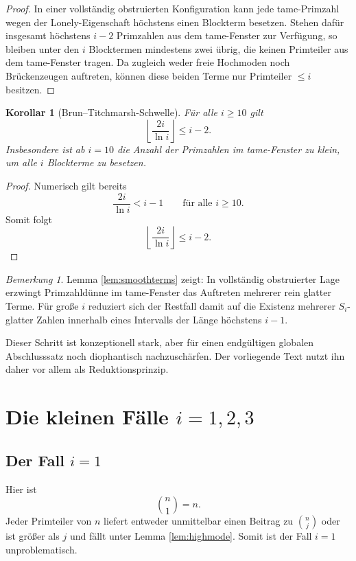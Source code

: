 \documentclass[12pt,a4paper]{article}
\theoremstyle{plain}
\newtheorem{korollar}{Korollar}
\theoremstyle{definition}
\theoremstyle{remark}
\newtheorem{bemerkung}{Bemerkung}
\begin{document}
	\begin{proof}
		In einer vollständig obstruierten Konfiguration kann jede tame-Primzahl wegen der Lonely-Eigenschaft höchstens einen Blockterm besetzen. 
		Stehen dafür insgesamt höchstens $i-2$ Primzahlen aus dem tame-Fenster zur Verfügung, so bleiben unter den $i$ Blocktermen mindestens zwei übrig, die keinen Primteiler aus dem tame-Fenster tragen. 
		Da zugleich weder freie Hochmoden noch Brückenzeugen auftreten, können diese beiden Terme nur Primteiler $\le i$ besitzen.
	\end{proof}
	
	\begin{korollar}[Brun--Titchmarsh-Schwelle]\label{cor:bt}
		Für alle $i\ge 10$ gilt
		\[
		\left\lfloor \frac{2i}{\ln i}\right\rfloor \le i-2.
		\]
		Insbesondere ist ab $i=10$ die Anzahl der Primzahlen im tame-Fenster zu klein, um alle $i$ Blockterme zu besetzen.
	\end{korollar}
	
	\begin{proof}
		Numerisch gilt bereits
		\[
		\frac{2i}{\ln i}<i-1
		\qquad\text{für alle } i\ge 10.
		\]
		Somit folgt
		\[
		\left\lfloor \frac{2i}{\ln i}\right\rfloor \le i-2.
		\]
	\end{proof}
	
	\begin{bemerkung}
		Lemma \ref{lem:smoothterms} zeigt: In vollständig obstruierter Lage erzwingt Primzahldünne im tame-Fenster das Auftreten mehrerer rein glatter Terme. 
		Für große $i$ reduziert sich der Restfall damit auf die Existenz mehrerer $S_i$-glatter Zahlen innerhalb eines Intervalls der Länge höchstens $i-1$.
		
		Dieser Schritt ist konzeptionell stark, aber für einen endgültigen globalen Abschlusssatz noch diophantisch nachzuschärfen. 
		Der vorliegende Text nutzt ihn daher vor allem als Reduktionsprinzip.
	\end{bemerkung}
	
	\section{Die kleinen Fälle $i=1,2,3$}
	
	\subsection*{Der Fall $i=1$}
	
	Hier ist
	\[
	\binom{n}{1}=n.
	\]
	Jeder Primteiler von $n$ liefert entweder unmittelbar einen Beitrag zu $\binom{n}{j}$ oder ist größer als $j$ und fällt unter Lemma \ref{lem:highmode}. 
	Somit ist der Fall $i=1$ unproblematisch.
	
\end{document}

